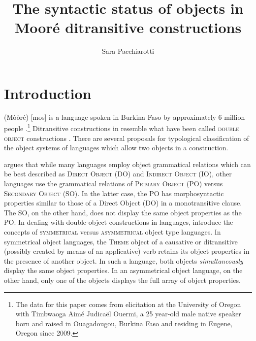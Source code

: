 \documentclass[output=paper]{langsci/langscibook}
\title{The syntactic status of objects in Mooré ditransitive constructions}
\author{%
 Sara Pacchiarotti\affiliation{University of Oregon}
}
\begin{document}


\section{Introduction}\label{§1:introduction.pacchiarotti}
\largerpage[-2]
 (Mòòré) [mos] is a  language spoken in Burkina Faso by approximately 6 million people \citep{lewisetal2016}.\footnote{The data for this paper comes from elicitation at the University of Oregon with Timbwaoga Aimé Judicaël Ouermi, a 25 year-old male native   speaker born and raised in Ouagadougou, Burkina Faso and residing in Eugene, Oregon since 2009.} Ditransitive constructions in  resemble what have been called \textsc{double object} constructions \citep{dryer1986,dryer2007,goldberg1995}. There are several proposals for typological classification of the object systems of languages which allow two objects in a construction.

\citet{dryer1986} argues that while many languages employ object grammatical relations which can be best described as \textsc{Direct Object} (DO) and \textsc{Indirect Object} (IO), other languages use the grammatical relations of \textsc{Primary Object} (PO) versus \textsc{Secondary Object} (SO). In the latter case, the PO has morphosyntactic properties similar to those of a Direct Object (DO) in a monotransitive clause. The SO, on the other hand, does not display the same object properties as the PO. In dealing with double-object constructions in  languages, \citet{bresnanmoshi1990} introduce the concepts of \textsc{symmetrical} versus \textsc{asymmetrical} object type languages. In symmetrical object languages, the \textsc{Theme} object of a causative or ditransitive (possibly created by means of an applicative) verb retains its object properties in the presence of another object. In such a language, both objects \textit{simultaneously} display the same object properties. In an asymmetrical object language, on the other hand, only one of the objects displays the full array of object properties. 
\end{document}
